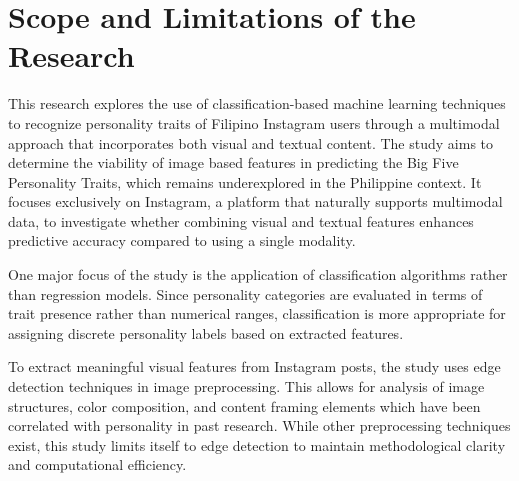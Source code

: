 %
%




\section{Scope and Limitations of the Research}
\label{sec:scopelimitations}


	This research explores the use of classification-based machine learning techniques to recognize personality traits of Filipino Instagram users through a multimodal approach that incorporates both visual and textual content. The study aims to determine the viability of image based features in predicting the Big Five Personality Traits, which remains underexplored in the Philippine context. It focuses exclusively on Instagram, a platform that naturally supports multimodal data, to investigate whether combining visual and textual features enhances predictive accuracy compared to using a single modality.
	
	One major focus of the study is the application of classification algorithms rather than regression models. Since personality categories are evaluated in terms of trait presence rather than numerical ranges, classification is more appropriate for assigning discrete personality labels based on extracted features.
	
	To extract meaningful visual features from Instagram posts, the study uses edge detection techniques in image preprocessing. This allows for analysis of image structures, color composition, and content framing elements which have been correlated with personality in past research. While other preprocessing techniques exist, this study limits itself to edge detection to maintain methodological clarity and computational efficiency.
	
